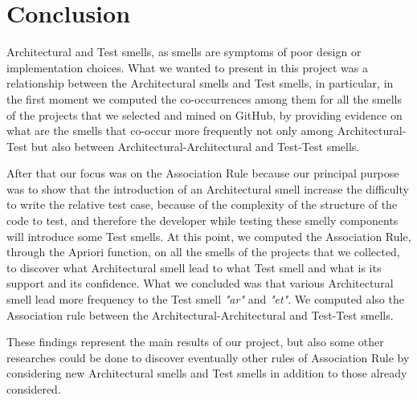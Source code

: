 \section{Conclusion}\label{sec:conclusion}

 Architectural and Test smells, as smells are symptoms of poor design or implementation choices. What we wanted to present in this project was a relationship between the Architectural smells and Test smells, in particular, in the first moment we computed the co-occurrences among them for all the smells of the projects that we selected and mined on GitHub, by providing evidence on what are the smells that co-occur more frequently not only among Architectural-Test but also between Architectural-Architectural and Test-Test smells.

After that our focus was on the Association Rule because our principal purpose was to show that the introduction of an Architectural smell increase the difficulty to write the relative test case, because of the complexity of the structure of the code to test, and therefore the developer while testing these smelly components will introduce some Test smells. At this point, we computed the Association Rule, through the Apriori function, on all the smells of the projects that we collected, to discover what Architectural smell lead to what Test smell and what is its support and its confidence. What we concluded was that various Architectural smell lead more frequency to the Test smell \textit{"ar"} and \textit{"et"}. We computed also the Association rule between the Architectural-Architectural and Test-Test smells.

These findings represent the main results of our project, but also some other researches could be done to discover eventually other rules of Association Rule by considering new Architectural smells and Test smells in addition to those already considered.
